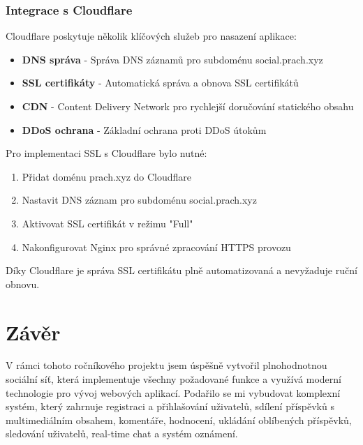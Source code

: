 \documentclass[12pt]{article}
\begin{document}
\subsubsection{Integrace s Cloudflare}
Cloudflare poskytuje několik klíčových služeb pro nasazení aplikace:
\begin{itemize}
\item \textbf{DNS správa} - Správa DNS záznamů pro subdoménu social.prach.xyz
\item \textbf{SSL certifikáty} - Automatická správa a obnova SSL certifikátů
\item \textbf{CDN} - Content Delivery Network pro rychlejší doručování statického obsahu
\item \textbf{DDoS ochrana} - Základní ochrana proti DDoS útokům
\end{itemize}
Pro implementaci SSL s Cloudflare bylo nutné:
\begin{enumerate}
\item Přidat doménu prach.xyz do Cloudflare
\item Nastavit DNS záznam pro subdoménu social.prach.xyz
\item Aktivovat SSL certifikát v režimu "Full"
\item Nakonfigurovat Nginx pro správné zpracování HTTPS provozu
\end{enumerate}
Díky Cloudflare je správa SSL certifikátu plně automatizovaná a nevyžaduje ruční obnovu.

\newpage
\section{Závěr}

V rámci tohoto ročníkového projektu jsem úspěšně vytvořil plnohodnotnou sociální síť, která implementuje všechny požadované funkce a využívá moderní technologie pro vývoj webových aplikací. Podařilo se mi vybudovat komplexní systém, který zahrnuje registraci a přihlašování uživatelů, sdílení příspěvků s multimediálním obsahem, komentáře, hodnocení, ukládání oblíbených příspěvků, sledování uživatelů, real-time chat a systém oznámení.
\end{document}
